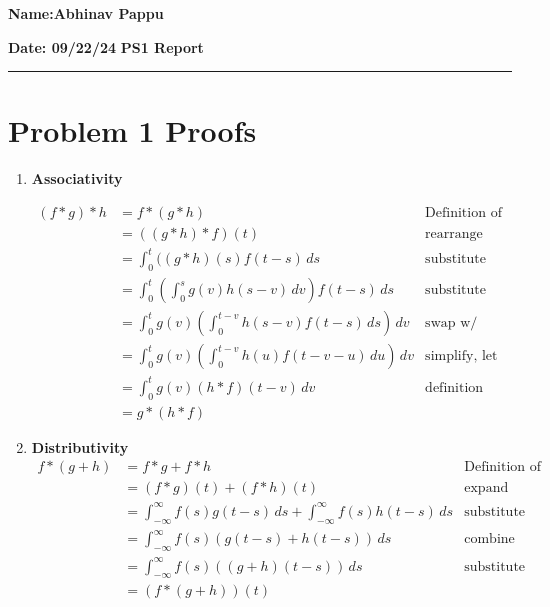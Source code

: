 \documentclass[11pt]{article}
\begin{document}
{\large{\bf Name:Abhinav Pappu} {\hspace{3in}}}

{\large{\bf Date: 09/22/24} {\hspace{3in}}}
{\LARGE{\bf PS1 Report}}

\vspace{0.2\baselineskip}
\hrule

\section*{Problem 1 Proofs}
\begin{enumerate}
    \item {\bf Associativity}
    
\begin{align*}
    (f * g) * h &= f * (g * h) & \text{Definition of Associativity} \\
    &=((g*h)*f)(t) & \text{rearrange and expand} \\
    &=\int_{0}^{t} ((g*h)(s)f(t-s) \, ds  & \text{substitute definition} \\
    &=\int_{0}^{t} \left(\int_{0}^{s} g(v)h(s-v) \, dv\right)f(t-s) \, ds & \text{substitute definition}\\
    &=\int_{0}^{t} g(v)\left(\int_{0}^{t-v} h(s-v)f(t-s) \, ds\right) \, dv & \text{swap w/ Fubini's}\\
    &=\int_{0}^{t}g(v) \left(\int_{0}^{t-v} h(u)f(t-v-u) \, du\right) \, dv & \text{simplify, let u = s-v}\\
    &=\int_{0}^{t} g(v)(h*f)(t-v) \, dv & \text{definition}\\
    &= g*(h*f)
\end{align*}
    
\item \textbf{Distributivity}    
\begin{align*}
    f * (g+h) &= f*g + f*h & \text{Definition of Distributivity}\\
    &= (f*g)(t) + (f*h)(t) & \text{expand}\\
    &= \int_{-\infty}^{\infty} f(s)g(t-s) \, ds + \int_{-\infty}^{\infty} f(s)h(t-s) \, ds & \text{substitute definition}\\
    &= \int_{-\infty}^{\infty} f(s)(g(t-s) + h(t-s)) \, ds & \text{combine integrals}\\
    &= \int_{-\infty}^{\infty} f(s)((g+h)(t-s)) \, ds & \text{substitute definition}\\
    &= (f * (g+h))(t)
\end{align*}


\end{enumerate}
\end{document}
